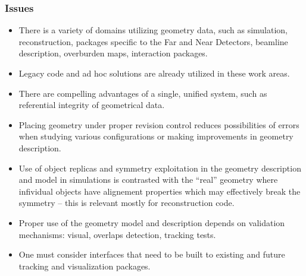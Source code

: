 \subsubsection{Issues}
\begin{itemize}
	
	\item  There is a variety of domains utilizing geometry data, such as simulation, reconstruction, packages specific to the Far and Near Detectors, beamline description, overburden maps, interaction packages.
	
	\item  Legacy code and ad hoc solutions are already utilized in these work areas.
	
	\item There are compelling advantages of a single, unified system, such as referential integrity of geometrical data.
	
	\item Placing geometry under proper revision control reduces possibilities of errors when studying various configurations 
	or making improvements in geometry description.
	
	\item  Use of object replicas and symmetry exploitation in the geometry description and model in simulations is 
	contrasted with the ``real'' geometry where infividual objects have alignement properties which may effectively 
	break the symmetry -- this is relevant mostly for reconstruction code.
	
	\item Proper use of the geometry model and description depends on validation mechanisms: visual, overlaps detection, tracking tests.
	
	\item One must consider interfaces that need to be built to existing and future tracking and visualization packages.
	
\end{itemize}

